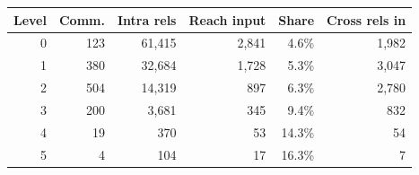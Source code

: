 \begin{tabular}{@{}rrrrrr@{}}
\toprule
Level & Comm. & Intra rels & Reach input & Share & Cross rels in \\
\midrule
0 & 123 & 61{,}415 & 2{,}841 & 4.6\% & 1{,}982 \\
1 & 380 & 32{,}684 & 1{,}728 & 5.3\% & 3{,}047 \\
2 & 504 & 14{,}319 & 897 & 6.3\% & 2{,}780 \\
3 & 200 & 3{,}681 & 345 & 9.4\% & 832 \\
4 & 19 & 370 & 53 & 14.3\% & 54 \\
5 & 4 & 104 & 17 & 16.3\% & 7 \\
\bottomrule
\end{tabular}
